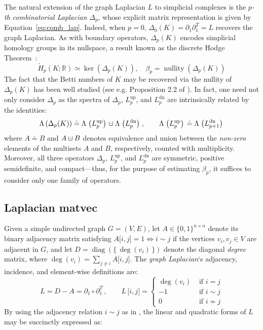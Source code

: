 \documentclass[pdflatex,sn-mathphys-num]{sn-jnl}
\newcommand{\cupdot}{\mathbin{\mathaccent\cdot\cup}}
\begin{document}
\begin{appendices}
The natural extension of the graph Laplacian \(L\) to simplicial complexes is the \emph{\(p\)-th combinatorial Laplacian} \(\Delta_{p}\), whose explicit matrix representation is given by Equation~\ref{eq:comb_lap}. Indeed, when \(p = 0\), \(\Delta_{0}(K) = \partial_{1}\partial_{1}^{T} = L\) recovers the graph Laplacian. As with boundary operators, \(\Delta_{p}(K)\) encodes simplicial homology groups in its nullspace, a result known as the discrete Hodge Theorem~\cite{lim2020hodge}:
\[
{\widetilde{H}}_{p}\left( K;\mathbb{R} \right) \simeq \ker\left( \Delta_{p}(K) \right),\quad\beta_{p} = \operatorname{nullity}\left( \Delta_{p}(K) \right)
\]
\noindent The fact that the Betti numbers of \(K\) may be recovered via the nullity of \(\Delta_{p}(K)\) has been well studied (see e.g. Proposition 2.2 of \cite{horak2013spectra}). In fact, one need not only consider \(\Delta_{p}\) as the spectra of \(\Delta_{p}\), \(L_{p}^{\operatorname{up}}\), and \(L_{p}^{\operatorname{dn}}\) are intrinsically related by the identities:
\[
\Lambda\left( \Delta_{p}(K) \right) \doteq \Lambda\left. \left( L_{p}^{\operatorname{up}} \right) \right. 
\cupdot
\Lambda\left. \left( L_{p}^{\operatorname{dn}} \right) \right.,\quad\quad\Lambda\left. \left( L_{p}^{\operatorname{up}} \right) \right. \doteq \Lambda\left. \left( L_{p + 1}^{\operatorname{dn}} \right) \right.\]
\noindent where \(A \doteq B\) and \(A \cupdot B\) denotes equivalence and union between the \emph{non-zero} elements of the multisets \(A\) and \(B\), respectively, counted with multiplicity. Moreover, all three operators \(\Delta_{p}\), \(L_{p}^{\operatorname{up}}\), and \(L_{p}^{\operatorname{dn}}\) are symmetric, positive semidefinite, and compact---thus, for the purpose of estimating \(\beta_{p}\), it suffices to consider only one family of operators.

\subsection{Laplacian matvec}\label{app:lap_matvec}

Given a simple undirected graph \(G = (V,E)\), let \(A \in \{ 0,1\}^{n \times n}\) denote its binary adjacency matrix satisfying \(A\left. \lbrack i,j\rbrack \right. = 1 \Leftrightarrow i \sim j\) if the vertices \(v_{i},v_{j} \in V\) are adjacent in \(G\), and let \(D = \operatorname{diag}\left. \left( \{\,\deg\left( v_{i} \right)\,\} \right) \right.\) denote the diagonal \emph{degree} matrix, where \(\deg\left( v_{i} \right) = \sum_{j \neq i}A\left. \lbrack i,j\rbrack \right.\). The \emph{graph Laplacian}`s adjacency, incidence, and element-wise definitions are:
\[
L = D - A = \partial_{1} \circ \partial_{1}^{T}\,,\quad\quad L\,\left. \lbrack i,j\rbrack \right. = \begin{cases}
\deg\left( v_{i} \right) & \text{ if }i = j \\
 - 1 & \text{ if }i \sim j \\
0 & \text{ if }i \nsim j
\end{cases} 
\]
By using the adjacency relation \(i \sim j\) as in \cite{chung1997spectral}, the linear and quadratic forms of \(L\) may be succinctly expressed as:


\end{appendices}
\end{document}
